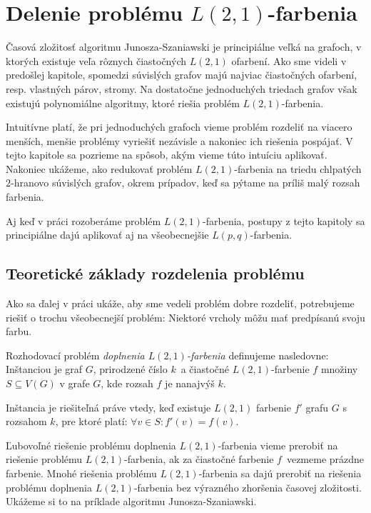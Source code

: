 \chapter{Delenie problému $L(2,1)$-farbenia}

Časová zložitosť algoritmu Junosza-Szaniawski je principiálne veľká na grafoch, v ktorých
existuje veľa rôznych čiastočných $L(2,1)$ ofarbení. Ako sme videli v predošlej kapitole,
spomedzi súvislých grafov majú najviac čiastočných ofarbení, resp. vlastných párov, stromy.
Na dostatočne jednoduchých triedach grafov však existujú polynomiálne algoritmy, ktoré
riešia problém $L(2,1)$-farbenia.

Intuitívne platí, že pri jednoduchých grafoch vieme problém rozdeliť na viacero menších,
menšie problémy vyriešiť nezávisle a nakoniec ich riešenia pospájať. V tejto kapitole
sa pozrieme na spôsob, akým vieme túto intuíciu aplikovať. Nakoniec ukážeme, ako redukovať
problém $L(2,1)$-farbenia na triedu chlpatých $2$-hranovo súvislých grafov, okrem prípadov,
keď sa pýtame na príliš malý rozsah farbenia.

Aj keď v práci rozoberáme problém $L(2,1)$-farbenia, postupy z tejto kapitoly sa principiálne
dajú aplikovať aj na všeobecnejšie $L(p,q)$-farbenia.

\section{Teoretické základy rozdelenia problému}

Ako sa ďalej v práci ukáže, aby sme vedeli problém dobre rozdeliť, potrebujeme riešiť
o trochu všeobecnejší problém: Niektoré vrcholy môžu mať predpísanú svoju farbu.

\begin{defn}
    Rozhodovací problém \emph{doplnenia $L(2,1)$-farbenia} definujeme nasledovne: Inštanciou je
    graf $G$, prirodzené číslo $k$ a čiastočné $L(2,1)$-farbenie $f$ množiny $S \subseteq V(G)$
    v grafe $G$, kde rozsah $f$ je nanajvýš $k$.

    Inštancia je riešiteľná práve vtedy, keď existuje $L(2,1)$ farbenie
    $f'$ grafu $G$ s rozsahom $k$, pre ktoré platí: $\forall v \in S: f'(v) = f(v)$.
\end{defn}

Ľubovoľné riešenie problému doplnenia $L(2,1)$-farbenia vieme prerobiť na riešenie
problému $L(2,1)$-farbenia, ak za čiastočné farbenie $f$ vezmeme prázdne farbenie.
Mnohé riešenia problému $L(2,1)$-farbenia sa dajú prerobiť na riešenia problému
doplnenia $L(2,1)$-farbenia bez výrazného zhoršenia časovej zložitosti.
Ukážeme si to na príklade algoritmu Junosza-Szaniawski.

